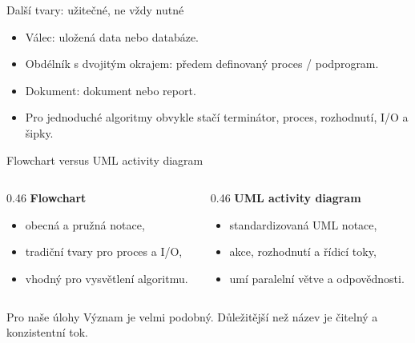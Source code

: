 \documentclass[aspectratio=169]{beamer}
\begin{document}
\begin{frame}{Další tvary: užitečné, ne vždy nutné}
  \centering
  \vspace{7mm}
  \begin{itemize}
    \item Válec: uložená data nebo databáze.
    \item Obdélník s dvojitým okrajem: předem definovaný proces / podprogram.
    \item Dokument: dokument nebo report.
    \item Pro jednoduché algoritmy obvykle stačí terminátor, proces, rozhodnutí, I/O a šipky.
  \end{itemize}
\end{frame}

\begin{frame}{Flowchart versus UML activity diagram}
  \begin{columns}[T]
    \begin{column}{0.46\textwidth}
      \textbf{Flowchart}
      \begin{itemize}
        \item obecná a pružná notace,
        \item tradiční tvary pro proces a I/O,
        \item vhodný pro vysvětlení algoritmu.
      \end{itemize}
    \end{column}
    \begin{column}{0.46\textwidth}
      \textbf{UML activity diagram}
      \begin{itemize}
        \item standardizovaná UML notace,
        \item akce, rozhodnutí a řídicí toky,
        \item umí paralelní větve a odpovědnosti.
      \end{itemize}
    \end{column}
  \end{columns}
  \begin{block}{Pro naše úlohy}
    Význam je velmi podobný. Důležitější než název je čitelný a konzistentní tok.
  \end{block}
\end{frame}
\end{document}
